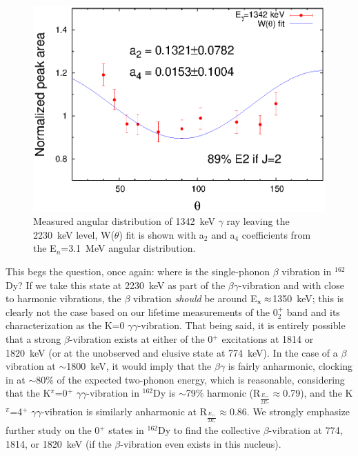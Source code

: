 
\begin{figure}[t]
\begin{center}
\includegraphics[width=0.999\textwidth]{figures/1342_AD.eps}
\caption{Measured angular distribution of 1342~keV $\gamma$ ray leaving the 2230~keV level, W($\theta$) fit is shown with a$_2$ and a$_4$ coefficients from the E$_n$=3.1~MeV angular distribution. \label{fig:1342_AD}}
\end{center}
\end{figure}

This begs the question, once again: where is the single-phonon $\beta$ vibration in $^{162}$Dy? If we take this state at 2230~keV as part of the $\beta\gamma$-vibration and with close to harmonic vibrations, the $\beta$ vibration \textit{should} be around E$_{\rm x}\approx$1350~keV; this is clearly not the case based on our lifetime measurements of the 0$^+_2$ band and its characterization as the K=0 $\gamma\gamma$-vibration. That being said, it is entirely possible that a strong $\beta$-vibration exists at either of the 0$^+$ excitations at 1814 or 1820~keV (or at the unobserved and elusive state at 774~keV). In the case of a $\beta$ vibration at $\sim$1800~keV, it would imply that the $\beta\gamma$ is fairly anharmonic, clocking in at $\sim$80\% of the expected two-phonon energy, which is reasonable, considering that the K$^\pi$=0$^+$ $\gamma\gamma$-vibration in $^{162}$Dy is $\sim$79\% harmonic (R$_{\frac{E_{\gamma\gamma}}{2E_\gamma}}\approx$0.79), and the K$^\pi$=4$^+$ $\gamma\gamma$-vibration is similarly anharmonic at R$_{\frac{E_{\gamma\gamma}}{2E_\gamma}}\approx$0.86. We strongly emphasize further study on the 0$^+$ states in $^{162}$Dy to find the collective $\beta$-vibration at 774, 1814, or 1820~keV (if the $\beta$-vibration even exists in this nucleus).

